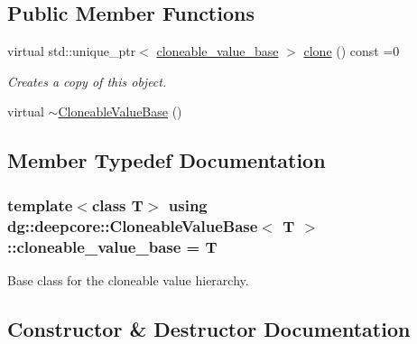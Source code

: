 \subsection*{Public Member Functions}
\begin{DoxyCompactItemize}
\item 
virtual std\+::unique\+\_\+ptr$<$ \hyperlink{structdg_1_1deepcore_1_1_cloneable_value_base_ad3c830a285f1c7c068fad7d7f10e128e}{cloneable\+\_\+value\+\_\+base} $>$ \hyperlink{structdg_1_1deepcore_1_1_cloneable_value_base_afa66af64c1335e01931f7919f0033730}{clone} () const =0
\begin{DoxyCompactList}\small\item\em Creates a copy of this object. \end{DoxyCompactList}\item 
virtual \hyperlink{structdg_1_1deepcore_1_1_cloneable_value_base_a60a4331acf407c703d44928b4a65009c}{$\sim$\+Cloneable\+Value\+Base} ()
\end{DoxyCompactItemize}


\subsection{Member Typedef Documentation}
\subsubsection[{\texorpdfstring{cloneable\+\_\+value\+\_\+base}{cloneable_value_base}}]{\setlength{\rightskip}{0pt plus 5cm}template$<$class T$>$ using {\bf dg\+::deepcore\+::\+Cloneable\+Value\+Base}$<$ T $>$\+::{\bf cloneable\+\_\+value\+\_\+base} =  T}\hypertarget{structdg_1_1deepcore_1_1_cloneable_value_base_ad3c830a285f1c7c068fad7d7f10e128e}{}\label{structdg_1_1deepcore_1_1_cloneable_value_base_ad3c830a285f1c7c068fad7d7f10e128e}


Base class for the cloneable value hierarchy. 



\subsection{Constructor \& Destructor Documentation}
